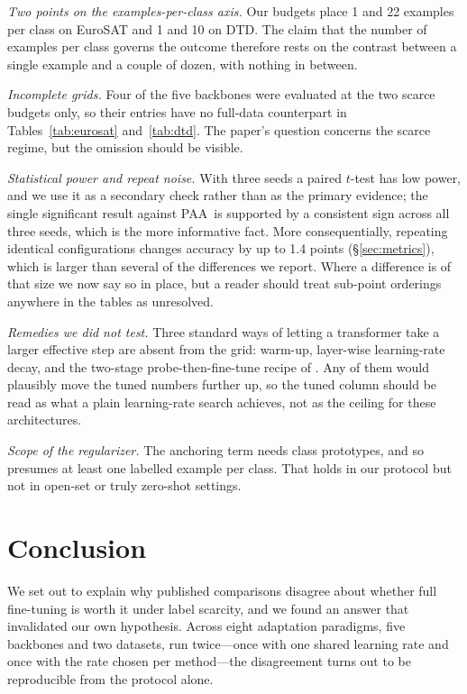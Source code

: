 \documentclass[preprint,12pt]{elsarticle}
\newcommand{\ours}{\textsc{PAA}}
\begin{document}
\emph{Two points on the examples-per-class axis.} Our budgets place 1 and 22
examples per class on EuroSAT and 1 and 10 on DTD. The claim that the number of
examples per class governs the outcome therefore rests on the contrast between a
single example and a couple of dozen, with nothing in between.

\emph{Incomplete grids.} Four of the five backbones were evaluated at the two
scarce budgets only, so their entries have no full-data counterpart in
Tables~\ref{tab:eurosat} and~\ref{tab:dtd}. The paper's question concerns the
scarce regime, but the omission should be visible.

\emph{Statistical power and repeat noise.} With three seeds a paired $t$-test has
low power, and we use it as a secondary check rather than as the primary evidence;
the single significant result against \ours\ is supported by a consistent sign
across all three seeds, which is the more informative fact. More consequentially,
repeating identical configurations changes accuracy by up to 1.4 points
(\S\ref{sec:metrics}), which is larger than several of the differences we report.
Where a difference is of that size we now say so in place, but a reader should
treat sub-point orderings anywhere in the tables as unresolved.

\emph{Remedies we did not test.} Three standard ways of letting a transformer
take a larger effective step are absent from the grid: warm-up, layer-wise
learning-rate decay, and the two-stage probe-then-fine-tune recipe of
\cite{kumar2022finetuning}. Any of them would plausibly move the tuned numbers
further up, so the tuned column should be read as what a plain learning-rate
search achieves, not as the ceiling for these architectures.

\emph{Scope of the regularizer.} The anchoring term needs class prototypes, and so
presumes at least one labelled example per class. That holds in our protocol but
not in open-set or truly zero-shot settings.

\section{Conclusion}
\label{sec:conclusion}

We set out to explain why published comparisons disagree about whether full
fine-tuning is worth it under label scarcity, and we found an answer that
invalidated our own hypothesis. Across eight adaptation paradigms, five backbones
and two datasets, run twice---once with one shared learning rate and once with the
rate chosen per method---the disagreement turns out to be reproducible from the
protocol alone.
\end{document}
